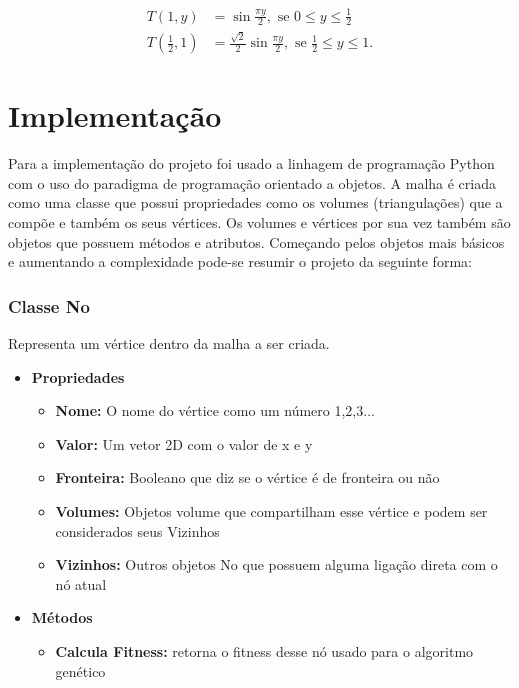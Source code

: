 \begin{equation*}
\begin{split}
    T(1,y)&=\sin{\frac{\pi y}{2}}, \text{ se } 0 \leq y \leq \frac{1}{2}\\
    T(\frac{1}{2},1)&=\frac{\sqrt{2}}{2}\sin{\frac{\pi y}{2}}, \text{ se } \frac{1}{2} \leq y \leq 1.
\end{split}
\end{equation*}
    
\section{Implementação}
Para a implementação do projeto foi usado a linhagem de programação Python com o uso do paradigma de programação orientado a objetos. A malha é criada como uma classe que possui propriedades como os volumes (triangulações) que a compõe e também os seus vértices. Os volumes e vértices por sua vez também são objetos que possuem métodos e atributos. Começando pelos objetos mais básicos e aumentando a complexidade pode-se resumir o projeto da seguinte forma:


\subsubsection{Classe No}
Representa um vértice dentro da malha a ser criada.

\begin{itemize}
    \item \textbf{Propriedades}
    \begin{itemize}
        \item \textbf{Nome:} O nome do vértice como um número 1,2,3...
        \item \textbf{Valor:} Um vetor 2D com o valor de x e y
        \item \textbf{Fronteira:} Booleano que diz se o vértice é de fronteira ou não
        \item \textbf{Volumes:} Objetos volume que compartilham esse vértice e podem ser considerados seus Vizinhos
        \item \textbf{Vizinhos:} Outros objetos No que possuem alguma ligação direta com o nó atual
    \end{itemize}
    \item \textbf{Métodos}
    \begin{itemize}
        \item \textbf{Calcula Fitness:} retorna o fitness desse nó usado para o algoritmo genético
    \end{itemize}
\end{itemize}

